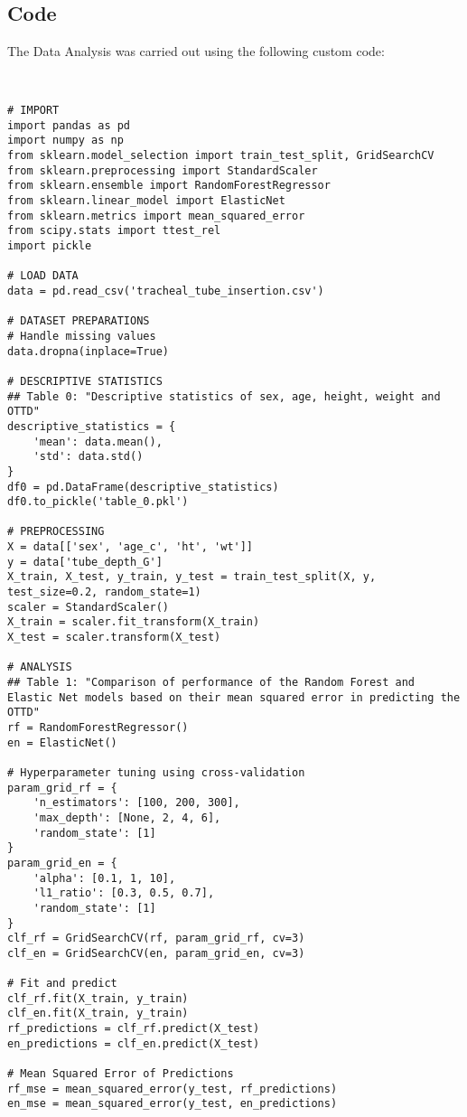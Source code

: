 \documentclass[11pt]{article}
\begin{document}
\subsection{{Code}}
The Data Analysis was carried out using the following custom code:

\begin{verbatim}


# IMPORT
import pandas as pd
import numpy as np
from sklearn.model_selection import train_test_split, GridSearchCV
from sklearn.preprocessing import StandardScaler
from sklearn.ensemble import RandomForestRegressor
from sklearn.linear_model import ElasticNet
from sklearn.metrics import mean_squared_error
from scipy.stats import ttest_rel
import pickle

# LOAD DATA
data = pd.read_csv('tracheal_tube_insertion.csv')

# DATASET PREPARATIONS
# Handle missing values
data.dropna(inplace=True)

# DESCRIPTIVE STATISTICS
## Table 0: "Descriptive statistics of sex, age, height, weight and OTTD"
descriptive_statistics = {
    'mean': data.mean(),
    'std': data.std()
}
df0 = pd.DataFrame(descriptive_statistics)
df0.to_pickle('table_0.pkl')

# PREPROCESSING
X = data[['sex', 'age_c', 'ht', 'wt']]
y = data['tube_depth_G']
X_train, X_test, y_train, y_test = train_test_split(X, y, test_size=0.2, random_state=1)
scaler = StandardScaler()
X_train = scaler.fit_transform(X_train)
X_test = scaler.transform(X_test)

# ANALYSIS
## Table 1: "Comparison of performance of the Random Forest and Elastic Net models based on their mean squared error in predicting the OTTD"
rf = RandomForestRegressor()
en = ElasticNet()

# Hyperparameter tuning using cross-validation
param_grid_rf = {
    'n_estimators': [100, 200, 300],
    'max_depth': [None, 2, 4, 6],
    'random_state': [1]
}
param_grid_en = {
    'alpha': [0.1, 1, 10],
    'l1_ratio': [0.3, 0.5, 0.7],
    'random_state': [1]
}
clf_rf = GridSearchCV(rf, param_grid_rf, cv=3)
clf_en = GridSearchCV(en, param_grid_en, cv=3)

# Fit and predict
clf_rf.fit(X_train, y_train)
clf_en.fit(X_train, y_train)
rf_predictions = clf_rf.predict(X_test)
en_predictions = clf_en.predict(X_test)

# Mean Squared Error of Predictions
rf_mse = mean_squared_error(y_test, rf_predictions)
en_mse = mean_squared_error(y_test, en_predictions)


\end{verbatim}
\end{document}
